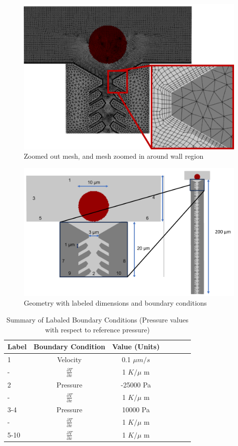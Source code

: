 \documentclass[conf]{new-aiaa}
\begin{document}
\begin{figure}[htp!]
\centering
\includegraphics[width=.75\textwidth]{Figures/Fig3.png}
\caption{Zoomed out mesh, and  mesh zoomed in around wall region}
\label{Fig3}
\end{figure}

\begin{figure}[htp!]
\centering
\includegraphics[width=.75\textwidth]{Figures/dimensions.png}
\caption{Geometry with labeled dimensions and boundary conditions}
\label{dimensions}
\end{figure}

\begin{table}
\caption{\label{tab:boundaryConditions} Summary of Labaled Boundary Conditions (Pressure values with respect to reference pressure)}
\centering
\begin{tabular}{lcccccc}
\hline
Label & Boundary Condition& Value (Units)\\\hline
1& Velocity & 0.1 $\mu m/s$\\
-& $\frac{\partial T}{\partial x}$& 1 $K/\mu$ m\\
2& Pressure& -25000 Pa\\
-& $\frac{\partial T}{\partial x}$& 1 $K/\mu$ m\\
3-4& Pressure& 10000 Pa\\
-& $\frac{\partial T}{\partial x}$& 1 $K/\mu$ m\\
5-10& $\frac{\partial T}{\partial x}$& 1 $K/\mu$ m\\
\hline
\end{tabular}
\end{table}
\end{document}
